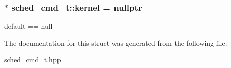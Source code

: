 \subsubsection[{kernel}]{$\ast$ sched\+\_\+cmd\+\_\+t\+::kernel = nullptr}\label{structsched__cmd__t_a8f78af789430b7661f52de7365abcdbc}
default == null 

The documentation for this struct was generated from the following file\+:\begin{DoxyCompactItemize}
\item 
sched\+\_\+cmd\+\_\+t.\+hpp\end{DoxyCompactItemize}
